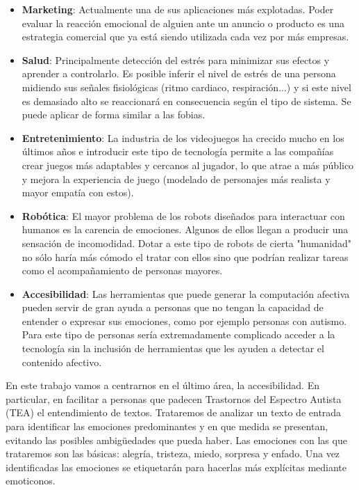 \begin{itemize}
	\item \textbf{Marketing}: Actualmente una de sus aplicaciones más explotadas. Poder evaluar la reacción emocional de alguien ante un anuncio o producto es una estrategia comercial que ya está siendo utilizada cada vez por más empresas.
	\item \textbf{Salud}: Principalmente detección del estrés para minimizar sus efectos y aprender a controlarlo. Es posible inferir el nivel de estrés de una persona midiendo sus señales fisiológicas (ritmo cardiaco, respiración...) y si este nivel es demasiado alto se reaccionará en consecuencia según el tipo de sistema. Se puede aplicar de forma similar a las fobias. 
	\item \textbf{Entretenimiento}: La industria de los videojuegos ha crecido mucho en los últimos años e introducir este tipo de tecnología permite a las compañías crear juegos más adaptables y cercanos al jugador, lo que atrae a más público y mejora la experiencia de juego (modelado de personajes más realista y mayor empatía con estos).
	\item \textbf{Robótica}: El mayor problema de los robots diseñados para interactuar con humanos es la carencia de emociones. Algunos de ellos llegan a producir una sensación de incomodidad. Dotar a este tipo de robots de cierta "humanidad" no sólo haría más cómodo el tratar con ellos sino que podrían realizar tareas como el acompañamiento de personas mayores.
	\item \textbf{Accesibilidad}: Las herramientas que puede generar la computación afectiva pueden servir de gran ayuda a personas que no tengan la capacidad de entender o expresar sus emociones, como por ejemplo personas con autismo. Para este tipo de personas sería extremadamente complicado acceder a la tecnología sin la inclusión de herramientas que les ayuden a detectar el contenido afectivo.
	
\end{itemize}

En este trabajo vamos a centrarnos en el último área, la accesibilidad. En particular, en facilitar a personas que padecen Trastornos del Espectro Autista (TEA) el entendimiento de textos. Trataremos de analizar un texto de entrada para identificar las emociones predominantes y en que medida se presentan, evitando las posibles ambigüedades que pueda haber. Las emociones con las que trataremos son las básicas: alegría, tristeza, miedo, sorpresa y enfado. Una vez identificadas las emociones se etiquetarán para hacerlas más explícitas mediante emoticonos.

